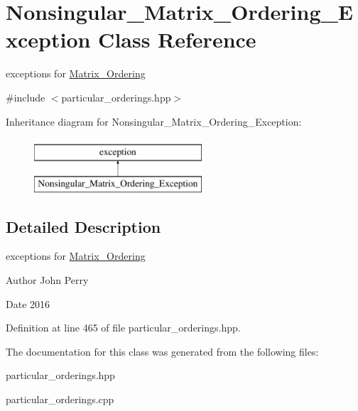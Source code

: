 \hypertarget{class_nonsingular___matrix___ordering___exception}{}\section{Nonsingular\+\_\+\+Matrix\+\_\+\+Ordering\+\_\+\+Exception Class Reference}
\label{class_nonsingular___matrix___ordering___exception}


exceptions for \hyperlink{class_matrix___ordering}{Matrix\+\_\+\+Ordering}  




{\ttfamily \#include $<$particular\+\_\+orderings.\+hpp$>$}

Inheritance diagram for Nonsingular\+\_\+\+Matrix\+\_\+\+Ordering\+\_\+\+Exception\+:\begin{figure}[H]
\begin{center}
\leavevmode
\includegraphics[height=2.000000cm]{class_nonsingular___matrix___ordering___exception}
\end{center}
\end{figure}


\subsection{Detailed Description}
exceptions for \hyperlink{class_matrix___ordering}{Matrix\+\_\+\+Ordering} 

\begin{DoxyAuthor}{Author}
John Perry 
\end{DoxyAuthor}
\begin{DoxyDate}{Date}
2016 
\end{DoxyDate}


Definition at line 465 of file particular\+\_\+orderings.\+hpp.



The documentation for this class was generated from the following files\+:\begin{DoxyCompactItemize}
\item 
particular\+\_\+orderings.\+hpp\item 
particular\+\_\+orderings.\+cpp\end{DoxyCompactItemize}
